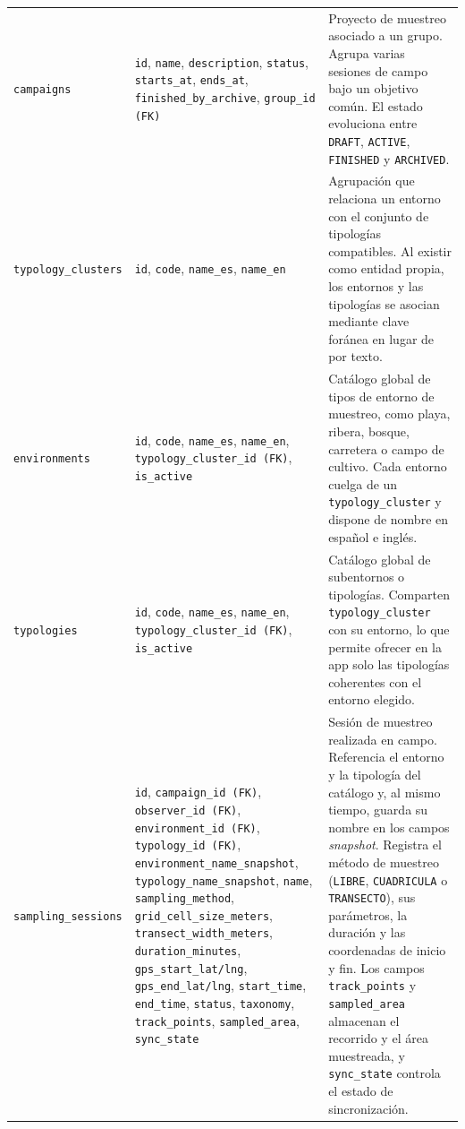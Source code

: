 \begin{longtable}{@{}>{\raggedright\arraybackslash}p{3.8cm}
                  >{\raggedright\arraybackslash}p{5.3cm}
                  >{\raggedright\arraybackslash}p{6.0cm}@{}}
  \texttt{campaigns} &
    \texttt{id}, \texttt{name}, \texttt{description}, \texttt{status},
    \texttt{starts\_at}, \texttt{ends\_at}, \texttt{finished\_by\_archive},
    \texttt{group\_id (FK)} &
    Proyecto de muestreo asociado a un grupo. Agrupa varias sesiones de campo bajo un
    objetivo común. El estado evoluciona entre \texttt{DRAFT}, \texttt{ACTIVE},
    \texttt{FINISHED} y \texttt{ARCHIVED}. \\[4pt]

  \texttt{typology\_clusters} &
    \texttt{id}, \texttt{code}, \texttt{name\_es}, \texttt{name\_en} &
    Agrupación que relaciona un entorno con el conjunto de tipologías compatibles. Al
    existir como entidad propia, los entornos y las tipologías se asocian mediante
    clave foránea en lugar de por texto. \\[4pt]

  \texttt{environments} &
    \texttt{id}, \texttt{code}, \texttt{name\_es}, \texttt{name\_en},
    \texttt{typology\_cluster\_id (FK)}, \texttt{is\_active} &
    Catálogo global de tipos de entorno de muestreo, como playa, ribera, bosque,
    carretera o campo de cultivo. Cada entorno cuelga de un \texttt{typology\_cluster}
    y dispone de nombre en español e inglés. \\[4pt]

  \texttt{typologies} &
    \texttt{id}, \texttt{code}, \texttt{name\_es}, \texttt{name\_en},
    \texttt{typology\_cluster\_id (FK)}, \texttt{is\_active} &
    Catálogo global de subentornos o tipologías. Comparten \texttt{typology\_cluster}
    con su entorno, lo que permite ofrecer en la app solo las tipologías coherentes
    con el entorno elegido. \\[4pt]

  \texttt{sampling\_sessions} &
    \texttt{id}, \texttt{campaign\_id (FK)}, \texttt{observer\_id (FK)},
    \texttt{environment\_id (FK)}, \texttt{typology\_id (FK)},
    \texttt{environment\_name\_snapshot}, \texttt{typology\_name\_snapshot},
    \texttt{name}, \texttt{sampling\_method}, \texttt{grid\_cell\_size\_meters},
    \texttt{transect\_width\_meters}, \texttt{duration\_minutes},
    \texttt{gps\_start\_lat/lng}, \texttt{gps\_end\_lat/lng}, \texttt{start\_time},
    \texttt{end\_time}, \texttt{status}, \texttt{taxonomy}, \texttt{track\_points},
    \texttt{sampled\_area}, \texttt{sync\_state} &
    Sesión de muestreo realizada en campo. Referencia el entorno y la tipología del
    catálogo y, al mismo tiempo, guarda su nombre en los campos \textit{snapshot}.
    Registra el método de muestreo (\texttt{LIBRE}, \texttt{CUADRICULA} o
    \texttt{TRANSECTO}), sus parámetros, la duración y las coordenadas de inicio y
    fin. Los campos \texttt{track\_points} y \texttt{sampled\_area} almacenan el
    recorrido y el área muestreada, y \texttt{sync\_state} controla el estado de
    sincronización. \\[4pt]


\end{longtable}
